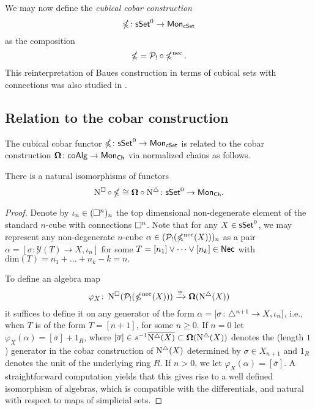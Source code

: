 We may now define the \textit{cubical cobar construction}
$$\operatorname{\mathbb{\Omega}} \colon \mathsf{sSet}^0 \to \mathsf{Mon}_{\mathsf{cSet}}$$ as the composition $$\operatorname{\mathbb{\Omega}}= \mathcal{P}_! \circ \operatorname{\mathbb{\Omega}^{\mathrm{nec}}}.$$ This reinterpretation of Baues construction in terms of cubical sets with connections was also studied in \cite{rivera2018cubical}.

\subsection{Relation to the cobar construction}

The cubical cobar functor $\operatorname{\mathbb{\Omega}}\colon \mathsf{sSet}^0 \to \mathsf{Mon}_{\mathsf{cSet}}$ is related to the cobar construction $\mathbf{\Omega}\colon \mathsf{coAlg} \to \mathsf{Mon}_{\mathsf{Ch}}$ via normalized chains as follows.

\begin{proposition} \label{p:ccobar and cobar}
	There is a natural isomorphisms of functors 
	\begin{equation*}
	\operatorname{N^{\square}} \circ \operatorname{\mathbb{\Omega}} \cong \mathbf{\Omega} \circ \operatorname{N^{\triangle}} \colon \mathsf{sSet}^0 \to \mathsf{Mon}_{\mathsf{Ch}}.
	\end{equation*}
\end{proposition}

\begin{proof} 
	Denote by $\iota_n \in (\square^n)_n$ the top dimensional non-degenerate element of the standard $n$-cube with connections $\square^n$.
	Note that for any $X \in \mathsf{sSet}^0$, we may represent any non-degenerate $n$-cube $\alpha \in (\mathcal{P}_!(\operatorname{\mathbb{\Omega}^{\mathrm{nec}}}(X)))_n$ as a pair $\alpha=[\sigma \colon \mathcal{Y}(T) \to X, \iota_n]$ for some $T=[n_1] \vee \dots \vee [n_k] \in \mathsf{Nec}$ with $\text{dim}(T)=n_1+ \dots+n_k-k=n.$
	
	To define an algebra map
	\begin{equation*}
	\varphi_X \colon \operatorname{N^{\square}}(\mathcal{P}_!(\operatorname{\mathbb{\Omega}^{\mathrm{nec}}}(X))) \xrightarrow{\cong} \mathbf{\Omega}(\operatorname{N^{\triangle}}(X))
	\end{equation*}
	it suffices to define it on any generator of the form $\alpha=[\sigma \colon \triangle^{n+1} \to X, \iota_{n}]$, i.e., when $T$ is of the form $T=[n+1]$, for some $n\geq0$.
	If $n=0$ let $\varphi_X(\alpha)= [\overline{\sigma}]+ 1_R$, where $[\overline{\sigma}] \in s^{-1} \overline{ \operatorname{N^{\triangle}}(X)} \subset \mathbf{\Omega}(\operatorname{N^{\triangle}}(X))$ denotes the (length $1$) generator in the cobar construction of $\operatorname{N^{\triangle}}(X)$ determined by $\sigma \in X_{n+1}$ and $1_R$ denotes the unit of the underlying ring $R$.
	If $n>0$, we let $\varphi_X(\alpha)=[\overline{\sigma}]$.
	A straightforward computation yields that this gives rise to a well defined isomorphism of algebras, which is compatible with the differentials, and natural with respect to maps of simplicial sets.
\end{proof}

